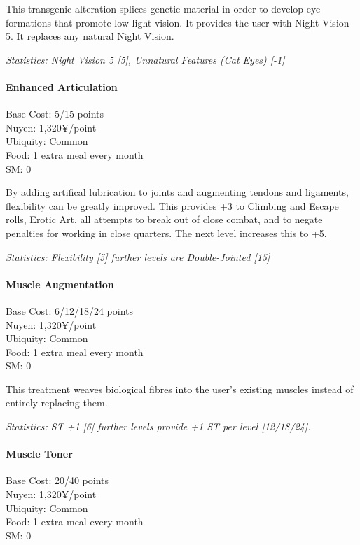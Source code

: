 \begin{multicols*}{3}
	This transgenic alteration splices genetic material in order to develop eye formations that promote low light vision. It provides the user with Night Vision 5. It replaces any natural Night Vision.
	
	\textit{\textcolor{OliveGreen}{Statistics: Night Vision 5 [5], Unnatural Features (Cat Eyes) [-1]}}
	
	\paragraph{Enhanced Articulation}
	\begin{flushright}
		Base Cost: 5/15 points\\
		Nuyen: 1,320¥/point\\
		Ubiquity: Common\\
		Food: 1 extra meal every month\\
		SM: 0\\
	\end{flushright}
	
	By adding artifical lubrication to joints and augmenting tendons and ligaments, flexibility can be greatly improved. This provides +3 to Climbing and Escape rolls, Erotic Art, all attempts to break out of close combat, and to negate penalties for working in close quarters. The next level increases this to +5.
	
	\textit{\textcolor{OliveGreen}{Statistics: Flexibility [5] further levels are Double-Jointed [15]}}
	
	\paragraph{Muscle Augmentation}
	\begin{flushright}
		Base Cost: 6/12/18/24 points\\
		Nuyen: 1,320¥/point\\
		Ubiquity: Common\\
		Food: 1 extra meal every month\\
		SM: 0\\
	\end{flushright}
	
	This treatment weaves biological fibres into the user's existing muscles instead of entirely replacing them.
	
	\textit{\textcolor{OliveGreen}{Statistics: ST +1 [6] further levels provide +1 ST per level [12/18/24].}}
	
	\paragraph{Muscle Toner}
	\begin{flushright}
		Base Cost: 20/40 points\\
		Nuyen: 1,320¥/point\\
		Ubiquity: Common\\
		Food: 1 extra meal every month\\
		SM: 0\\
	\end{flushright}
	

\end{multicols*}

